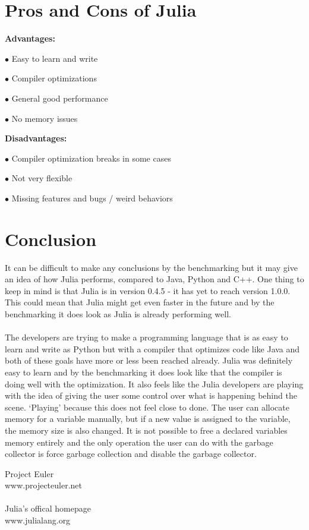 \documentclass[landscape, a0]{sciposter}
\begin{document}
\begin{multicols}{3}
\section{Pros and Cons of Julia}
\textbf{Advantages:}
\begin{list}{}{}
	\item[$\bullet$] Easy to learn and write
	\item[$\bullet$] Compiler optimizations
	\item[$\bullet$] General good performance
	\item[$\bullet$] No memory issues
\end{list}
\textbf{Disadvantages:}
\begin{list}{}{}
	\item[$\bullet$] Compiler optimization breaks in some cases
	\item[$\bullet$] Not very flexible
	\item[$\bullet$] Missing features and bugs / weird behaviors
\end{list}

\section{Conclusion}
It can be difficult to make any conclusions by the benchmarking but it may give an idea of how Julia performs, compared to Java, Python and C++. One thing to keep in mind is that Julia is in version 0.4.5 - it has yet to reach version 1.0.0. This could mean that Julia might get even faster in the future and by the benchmarking it does look as Julia is already performing well. \\ \\ The developers are trying to make a programming language that is as easy to learn and write as Python but with a compiler that optimizes code like Java and both of these goals have more or less been reached already. Julia was definitely easy to learn and by the benchmarking it does look like that the compiler is doing well with the optimization. It also feels like the Julia developers are playing with the idea of giving the user some control over what is happening behind the scene. ‘Playing’ because this does not feel close to done. The user can allocate memory for a variable manually, but if a new value is assigned to the variable, the memory size is also changed. It is not possible to free a declared variables memory entirely and the only operation the user can do with the garbage collector is force garbage collection and disable the garbage collector. 

\begin{thebibliography}{m}

Project Euler\\
www.projecteuler.net\\
\\
Julia's offical homepage\\
www.julialang.org


\end{thebibliography}


\end{multicols}
\end{document}
